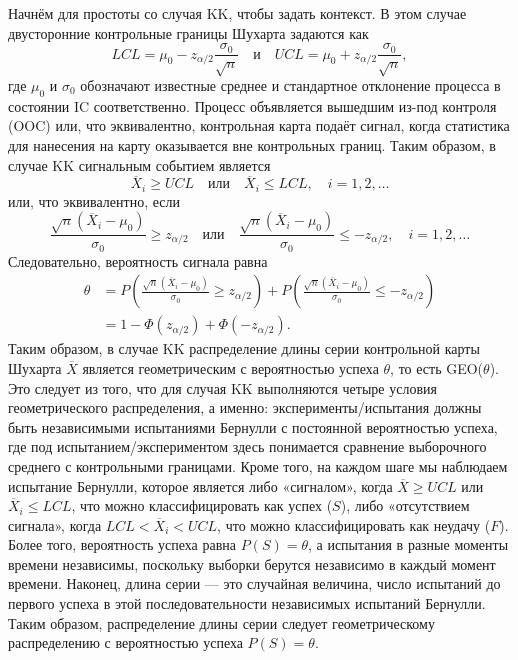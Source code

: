 Начнём для простоты со случая KK, чтобы задать контекст. В этом случае двусторонние контрольные границы Шухарта задаются как
\[
	LCL = \mu_0 - z_{\alpha/2}\frac{\sigma_0}{\sqrt{n}} \quad\text{и}\quad
	UCL = \mu_0 + z_{\alpha/2}\frac{\sigma_0}{\sqrt{n}},
\]
где \(\mu_0\) и \(\sigma_0\) обозначают известные среднее и стандартное отклонение процесса в состоянии IC соответственно. Процесс объявляется вышедшим из-под контроля (OOC) или, что эквивалентно, контрольная карта подаёт сигнал, когда статистика для нанесения на карту оказывается вне контрольных границ. Таким образом, в случае KK сигнальным событием является
\[
	\overline{X}_i \ge UCL \quad\text{или}\quad \overline{X}_i \le LCL, \quad i = 1, 2, \ldots
\]
или, что эквивалентно, если
\[
	\frac{\sqrt{n}(\overline{X}_i - \mu_0)}{\sigma_0} \ge z_{\alpha/2}
	\quad\text{или}\quad
	\frac{\sqrt{n}(\overline{X}_i - \mu_0)}{\sigma_0} \le -z_{\alpha/2}, \quad i = 1, 2, \ldots
\]
Следовательно, вероятность сигнала равна
\[
\begin{aligned}
	\theta &= P\left(\frac{\sqrt{n}(\overline{X}_i - \mu_0)}{\sigma_0} \ge z_{\alpha/2}\right)
	       + P\left(\frac{\sqrt{n}(\overline{X}_i - \mu_0)}{\sigma_0} \le -z_{\alpha/2}\right) \\
	       &= 1 - \Phi(z_{\alpha/2}) + \Phi(-z_{\alpha/2}).
\end{aligned}
\]
Таким образом, в случае KK распределение длины серии контрольной карты Шухарта \(\overline{X}\) является геометрическим с вероятностью успеха \(\theta\), то есть GEO(\(\theta\)). Это следует из того, что для случая KK выполняются четыре условия геометрического распределения, а именно: эксперименты/испытания должны быть независимыми испытаниями Бернулли с постоянной вероятностью успеха, где под испытанием/экспериментом здесь понимается сравнение выборочного среднего с контрольными границами. Кроме того, на каждом шаге мы наблюдаем испытание Бернулли, которое является либо «сигналом», когда \(\overline{X} \ge UCL\) или \(\overline{X}_i \le LCL\), что можно классифицировать как успех (\(S\)), либо «отсутствием сигнала», когда \(LCL < \overline{X}_i < UCL\), что можно классифицировать как неудачу (\(F\)). Более того, вероятность успеха равна \(P(S) = \theta\), а испытания в разные моменты времени независимы, поскольку выборки берутся независимо в каждый момент времени. Наконец, длина серии — это случайная величина, число испытаний до первого успеха в этой последовательности независимых испытаний Бернулли. Таким образом, распределение длины серии следует геометрическому распределению с вероятностью успеха \(P(S) = \theta\).


